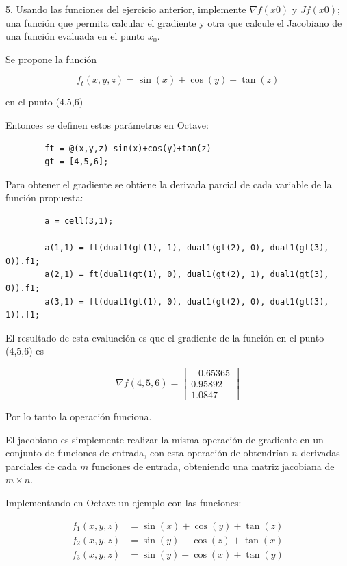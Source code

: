 \documentclass[a4paper, 12pt]{article}
\begin{document}
    5. Usando las funciones del ejercicio anterior, implemente $\nabla f(x0)$ y $Jf(x0)$; una función que permita calcular el gradiente y otra que calcule el Jacobiano de una función evaluada en el punto $x_0$.

    Se propone la función

    \[
        f_t(x,y,z) = \sin(x) + \cos(y)+ \tan(z)
    \]

    en el punto (4,5,6)

    Entonces se definen estos parámetros en Octave:

    \begin{verbatim}
        ft = @(x,y,z) sin(x)+cos(y)+tan(z)
        gt = [4,5,6];
    \end{verbatim}

    Para obtener el gradiente se obtiene la derivada parcial de cada variable de la función propuesta:

    \begin{verbatim}
        a = cell(3,1);

        a(1,1) = ft(dual1(gt(1), 1), dual1(gt(2), 0), dual1(gt(3), 0)).f1;
        a(2,1) = ft(dual1(gt(1), 0), dual1(gt(2), 1), dual1(gt(3), 0)).f1;
        a(3,1) = ft(dual1(gt(1), 0), dual1(gt(2), 0), dual1(gt(3), 1)).f1;
    \end{verbatim}

    El resultado de esta evaluación es que el gradiente de la función en el punto (4,5,6) es

    \[
        \nabla f(4,5,6) = \begin{bmatrix}
            -0.65365 \\
            0.95892 \\
            1.0847
        \end{bmatrix}
    \]

    Por lo tanto la operación funciona.

    El jacobiano es simplemente realizar la misma operación de gradiente en un conjunto de funciones de entrada, con esta operación de obtendrían $n$ derivadas parciales de cada $m$ funciones de entrada, obteniendo una matriz jacobiana de $m \times n$.

    Implementando en Octave un ejemplo con las funciones:

    \begin{align*}
        f_1(x,y,z) &= \sin(x) + \cos(y)+ \tan(z) \\
        f_2(x,y,z) &= \sin(y) + \cos(z)+ \tan(x) \\
        f_3(x,y,z) &= \sin(y) + \cos(x)+ \tan(y) \\
    \end{align*}
\end{document}
